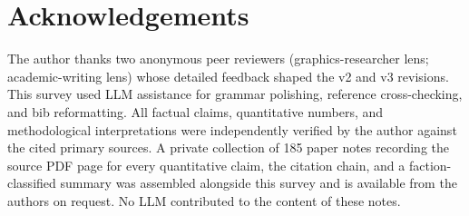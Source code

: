 \documentclass[acmlarge,sigconf,nonacm,review=false,letterpaper]{acmart}
\begin{document}
\section*{Acknowledgements}
The author thanks two anonymous peer reviewers
(graphics-researcher lens; academic-writing lens) whose
detailed feedback shaped the v2 and v3 revisions. This survey used LLM assistance for grammar
polishing, reference cross-checking, and bib reformatting. All
factual claims, quantitative numbers, and methodological
interpretations were independently verified by the author against
the cited primary sources. A private collection of 185 paper notes recording the
source PDF page for every quantitative claim, the citation
chain, and a faction-classified summary was assembled
alongside this survey and is available from the
authors on request. No LLM contributed to the content of
these notes.
\end{document}
